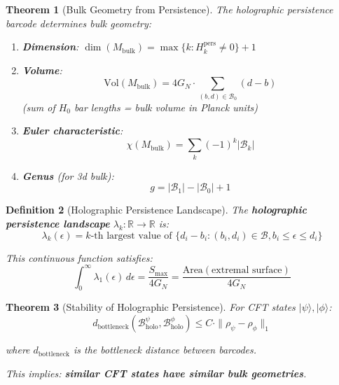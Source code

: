 \documentclass[12pt,a4paper]{article}
\newtheorem{theorem}{Theorem}[section]
\newtheorem{definition}[theorem]{Definition}
\begin{document}
\begin{theorem}[Bulk Geometry from Persistence]\label{thm:bulk-persistence}
The holographic persistence barcode determines bulk geometry:
\begin{enumerate}
    \item \textbf{Dimension}: $\dim(M_{\text{bulk}}) = \max\{k : H_k^{\text{pers}} \neq 0\} + 1$
    
    \item \textbf{Volume}: 
    \begin{equation}
    \text{Vol}(M_{\text{bulk}}) = 4G_N \cdot \sum_{(b,d) \in \mathcal{B}_0} (d - b)
    \end{equation}
    (sum of $H_0$ bar lengths = bulk volume in Planck units)
    
    \item \textbf{Euler characteristic}:
    \begin{equation}
    \chi(M_{\text{bulk}}) = \sum_k (-1)^k |\mathcal{B}_k|
    \end{equation}
    
    \item \textbf{Genus} (for 3d bulk):
    \begin{equation}
    g = |\mathcal{B}_1| - |\mathcal{B}_0| + 1
    \end{equation}
\end{enumerate}
\end{theorem}

\begin{definition}[Holographic Persistence Landscape]\label{def:holo-landscape}
The \textbf{holographic persistence landscape} $\lambda_k: \mathbb{R} \to \mathbb{R}$ is:
\begin{equation}
\lambda_k(\epsilon) = \text{$k$-th largest value of } \{d_i - b_i : (b_i, d_i) \in \mathcal{B}, b_i \leq \epsilon \leq d_i\}
\end{equation}

This continuous function satisfies:
\begin{equation}
\int_0^\infty \lambda_1(\epsilon) \, d\epsilon = \frac{S_{\max}}{4G_N} = \frac{\text{Area}(\text{extremal surface})}{4G_N}
\end{equation}
\end{definition}

\begin{theorem}[Stability of Holographic Persistence]\label{thm:holo-stability}
For CFT states $|\psi\rangle, |\phi\rangle$:
\begin{equation}
d_{\text{bottleneck}}(\mathcal{B}_{\text{holo}}^{\psi}, \mathcal{B}_{\text{holo}}^{\phi}) \leq C \cdot \|\rho_\psi - \rho_\phi\|_1
\end{equation}

where $d_{\text{bottleneck}}$ is the bottleneck distance between barcodes.

This implies: \textbf{similar CFT states have similar bulk geometries}.
\end{theorem}
\end{document}
